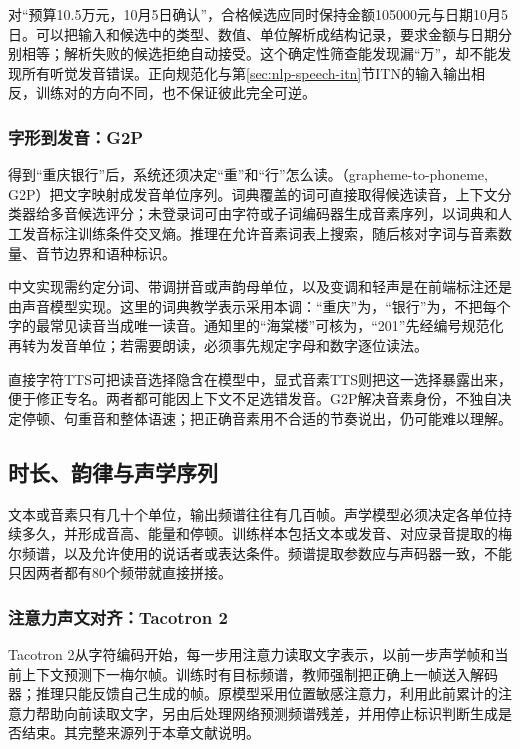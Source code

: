 对“预算10.5万元，10月5日确认”，合格候选应同时保持金额105000元与日期10月5日。可以把输入和候选中的类型、数值、单位解析成结构记录，要求金额与日期分别相等；解析失败的候选拒绝自动接受。这个确定性筛查能发现漏“万”，却不能发现所有听觉发音错误。正向规范化与第\ref{sec:nlp-speech-itn}节ITN的输入输出相反，训练对的方向不同，也不保证彼此完全可逆。

\subsubsection{字形到发音：G2P}
\label{sec:nlp-speech-g2p}

得到“重庆银行”后，系统还须决定“重”和“行”怎么读。（grapheme-to-phoneme, G2P）把文字映射成发音单位序列。词典覆盖的词可直接取得候选读音，上下文分类器给多音候选评分；未登录词可由字符或子词编码器生成音素序列，以词典和人工发音标注训练条件交叉熵。推理在允许音素词表上搜索，随后核对字词与音素数量、音节边界和语种标识。

中文实现需约定分词、带调拼音或声韵母单位，以及变调和轻声是在前端标注还是由声音模型实现。这里的词典教学表示采用本调：“重庆”为，“银行”为，不把每个字的最常见读音当成唯一读音。通知里的“海棠楼”可核为，“201”先经编号规范化再转为发音单位；若需要朗读，必须事先规定字母和数字逐位读法。

直接字符TTS可把读音选择隐含在模型中，显式音素TTS则把这一选择暴露出来，便于修正专名。两者都可能因上下文不足选错发音。G2P解决音素身份，不独自决定停顿、句重音和整体语速；把正确音素用不合适的节奏说出，仍可能难以理解。

\subsection{时长、韵律与声学序列}
\label{sec:nlp-speech-acoustics}

文本或音素只有几十个单位，输出频谱往往有几百帧。声学模型必须决定各单位持续多久，并形成音高、能量和停顿。训练样本包括文本或发音、对应录音提取的梅尔频谱，以及允许使用的说话者或表达条件。频谱提取参数应与声码器一致，不能只因两者都有80个频带就直接拼接。

\subsubsection{注意力声文对齐：Tacotron 2}
\label{sec:nlp-speech-tacotron}

Tacotron 2从字符编码开始，每一步用注意力读取文字表示，以前一步声学帧和当前上下文预测下一梅尔帧。训练时有目标频谱，教师强制把正确上一帧送入解码器；推理只能反馈自己生成的帧。原模型采用位置敏感注意力，利用此前累计的注意力帮助向前读取文字，另由后处理网络预测频谱残差，并用停止标识判断生成是否结束。其完整来源列于本章文献说明。

